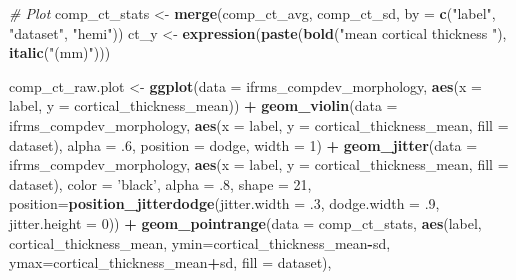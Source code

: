 \documentclass[
]{article}
\newenvironment{Shaded}{\begin{snugshade}}{\end{snugshade}}
\newcommand{\CommentTok}[1]{\textcolor[rgb]{0.56,0.35,0.01}{\textit{#1}}}
\newcommand{\DataTypeTok}[1]{\textcolor[rgb]{0.13,0.29,0.53}{#1}}
\newcommand{\DecValTok}[1]{\textcolor[rgb]{0.00,0.00,0.81}{#1}}
\newcommand{\FloatTok}[1]{\textcolor[rgb]{0.00,0.00,0.81}{#1}}
\newcommand{\KeywordTok}[1]{\textcolor[rgb]{0.13,0.29,0.53}{\textbf{#1}}}
\newcommand{\NormalTok}[1]{#1}
\newcommand{\OperatorTok}[1]{\textcolor[rgb]{0.81,0.36,0.00}{\textbf{#1}}}
\newcommand{\StringTok}[1]{\textcolor[rgb]{0.31,0.60,0.02}{#1}}
\begin{document}
\begin{Shaded}
\begin{Highlighting}[]
\CommentTok{# Plot}
\NormalTok{comp_ct_stats <-}\StringTok{ }\KeywordTok{merge}\NormalTok{(comp_ct_avg, comp_ct_sd, }\DataTypeTok{by =} \KeywordTok{c}\NormalTok{(}\StringTok{"label"}\NormalTok{, }\StringTok{"dataset"}\NormalTok{, }\StringTok{"hemi"}\NormalTok{))}
\NormalTok{ct_y <-}\StringTok{ }\KeywordTok{expression}\NormalTok{(}\KeywordTok{paste}\NormalTok{(}\KeywordTok{bold}\NormalTok{(}\StringTok{"mean cortical thickness "}\NormalTok{), }\KeywordTok{italic}\NormalTok{(}\StringTok{"(mm)"}\NormalTok{)))}

\NormalTok{comp_ct_raw.plot <-}\StringTok{ }\KeywordTok{ggplot}\NormalTok{(}\DataTypeTok{data =}\NormalTok{ ifrms_compdev_morphology, }
                           \KeywordTok{aes}\NormalTok{(}\DataTypeTok{x =}\NormalTok{ label, }\DataTypeTok{y =}\NormalTok{ cortical_thickness_mean)) }\OperatorTok{+}
\StringTok{  }\KeywordTok{geom_violin}\NormalTok{(}\DataTypeTok{data =}\NormalTok{ ifrms_compdev_morphology, }
              \KeywordTok{aes}\NormalTok{(}\DataTypeTok{x =}\NormalTok{ label, }\DataTypeTok{y =}\NormalTok{ cortical_thickness_mean, }\DataTypeTok{fill =}\NormalTok{ dataset), }
              \DataTypeTok{alpha =} \FloatTok{.6}\NormalTok{, }\DataTypeTok{position =}\NormalTok{ dodge, }\DataTypeTok{width =} \DecValTok{1}\NormalTok{) }\OperatorTok{+}\StringTok{ }
\StringTok{  }\KeywordTok{geom_jitter}\NormalTok{(}\DataTypeTok{data =}\NormalTok{ ifrms_compdev_morphology, }
              \KeywordTok{aes}\NormalTok{(}\DataTypeTok{x =}\NormalTok{ label, }\DataTypeTok{y =}\NormalTok{ cortical_thickness_mean, }\DataTypeTok{fill =}\NormalTok{ dataset), }
              \DataTypeTok{color =} \StringTok{'black'}\NormalTok{, }\DataTypeTok{alpha =} \FloatTok{.8}\NormalTok{, }\DataTypeTok{shape =} \DecValTok{21}\NormalTok{,}
              \DataTypeTok{position=}\KeywordTok{position_jitterdodge}\NormalTok{(}\DataTypeTok{jitter.width =} \FloatTok{.3}\NormalTok{, }\DataTypeTok{dodge.width =} \FloatTok{.9}\NormalTok{, }\DataTypeTok{jitter.height =} \DecValTok{0}\NormalTok{)) }\OperatorTok{+}
\StringTok{  }\KeywordTok{geom_pointrange}\NormalTok{(}\DataTypeTok{data =}\NormalTok{ comp_ct_stats, }
                  \KeywordTok{aes}\NormalTok{(label, cortical_thickness_mean, }
                      \DataTypeTok{ymin=}\NormalTok{cortical_thickness_mean}\OperatorTok{-}\NormalTok{sd, }\DataTypeTok{ymax=}\NormalTok{cortical_thickness_mean}\OperatorTok{+}\NormalTok{sd, }
                      \DataTypeTok{fill =}\NormalTok{ dataset), }

\end{Highlighting}
\end{Shaded}
\end{document}
